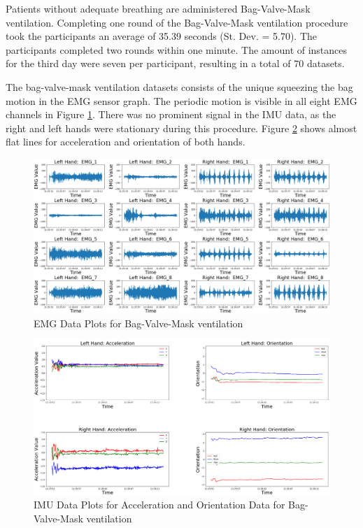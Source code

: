 Patients without adequate breathing are administered Bag-Valve-Mask ventilation. Completing one round of the Bag-Valve-Mask ventilation procedure took the participants an average of 35.39 seconds (St. Dev. = 5.70). The participants completed two rounds within one minute. The amount of instances for the third day were seven per participant, resulting in a total of 70 datasets.
\par The bag-valve-mask ventilation datasets consists of the unique squeezing the bag motion in the EMG sensor graph. The periodic motion is visible in all eight EMG channels in Figure \ref{fig:7073emgday3b46}. There was no prominent signal in the IMU data, as the right and left hands were stationary during this procedure. Figure \ref{fig:7073imuday3b46} shows almost flat lines for acceleration and orientation of both hands.
\begin{figure}[!h]
	\centering
	\includegraphics[width=0.8\linewidth]{pictures/7073_EMG_Day3_b_46}
	\caption{EMG Data Plots for Bag-Valve-Mask ventilation}
	\label{fig:7073emgday3b46}
\end{figure}
\begin{figure}[!h]
	\centering
	\includegraphics[width=0.8\linewidth]{pictures/7073_IMU_Day3_b_46}
	\caption{IMU Data Plots for Acceleration and Orientation Data for Bag-Valve-Mask ventilation}
	\label{fig:7073imuday3b46}
\end{figure}

